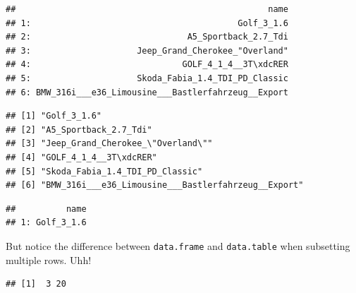 \documentclass[]{book}
\newenvironment{Shaded}{\begin{snugshade}}{\end{snugshade}}
\newcommand{\DecValTok}[1]{\textcolor[rgb]{0.00,0.00,0.81}{#1}}
\newcommand{\StringTok}[1]{\textcolor[rgb]{0.31,0.60,0.02}{#1}}
\newcommand{\CommentTok}[1]{\textcolor[rgb]{0.56,0.35,0.01}{\textit{#1}}}
\newcommand{\OperatorTok}[1]{\textcolor[rgb]{0.81,0.36,0.00}{\textbf{#1}}}
\newcommand{\NormalTok}[1]{#1}
\theoremstyle{definition}
\theoremstyle{definition}
\theoremstyle{definition}
\theoremstyle{remark}
\begin{document}
\begin{verbatim}
##                                                  name
## 1:                                         Golf_3_1.6
## 2:                               A5_Sportback_2.7_Tdi
## 3:                     Jeep_Grand_Cherokee_"Overland"
## 4:                              GOLF_4_1_4__3T\xdcRER
## 5:                     Skoda_Fabia_1.4_TDI_PD_Classic
## 6: BMW_316i___e36_Limousine___Bastlerfahrzeug__Export
\end{verbatim}

\begin{Shaded}
\end{Shaded}

\begin{verbatim}
## [1] "Golf_3_1.6"                                        
## [2] "A5_Sportback_2.7_Tdi"                              
## [3] "Jeep_Grand_Cherokee_\"Overland\""                  
## [4] "GOLF_4_1_4__3T\xdcRER"                             
## [5] "Skoda_Fabia_1.4_TDI_PD_Classic"                    
## [6] "BMW_316i___e36_Limousine___Bastlerfahrzeug__Export"
\end{verbatim}

\begin{Shaded}
\end{Shaded}

\begin{verbatim}
##          name
## 1: Golf_3_1.6
\end{verbatim}

But notice the difference between \texttt{data.frame} and
\texttt{data.table} when subsetting multiple rows. Uhh!

\begin{Shaded}
\end{Shaded}

\begin{verbatim}
## [1]  3 20
\end{verbatim}
\end{document}
